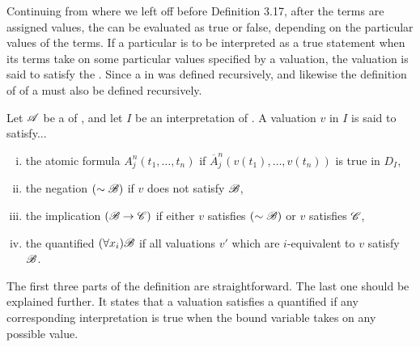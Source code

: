 Continuing from where we left off before Definition 3.17, after the terms are assigned values, the \wfs{} can be evaluated as true or false, depending on the particular values of the terms. If a particular \wf{} is to be interpreted as a true statement when its terms take on some particular values specified by a valuation, the valuation is said to satisfy the \wf{}. Since a \wf{} in \cl{} was defined recursively, and likewise the definition of  of a \wf{} must also be defined recursively.

\begin{definition}
  Let \(\mathscr{A}\) be a \wf{} of \cl{}, and let \(I\) be an interpretation of \cl{}. A valuation \(v\) in \(I\) is said to satisfy...
  \begin{enumerate}[(i)]
    \item the atomic formula \(A^n_j(t_1, \dots, t_n)\) if \(\overline{A}^n_j(v(t_1), \dots, v(t_n))\) is true in \(D_I\),
    \item the negation \((\sim\mathscr{B})\) if \(v\) does not satisfy \(\mathscr{B}\),
    \item the implication \((\mathscr{B} \rightarrow \mathscr{C})\) if either \(v\) satisfies \((\sim\mathscr{B})\) or \(v\) satisfies \(\mathscr{C}\),
    \item the quantified \wf{} \((\forall x_i)\mathscr{B}\) if all valuations \(v'\) which are \(i\)-equivalent to \(v\) satisfy \(\mathscr{B}\).
  \end{enumerate}

  \note{} The first three parts of the definition are straightforward. The last one should be explained further. It states that a valuation satisfies a quantified \wf{} if any corresponding interpretation is true when the bound variable takes on any possible value.
\end{definition}

